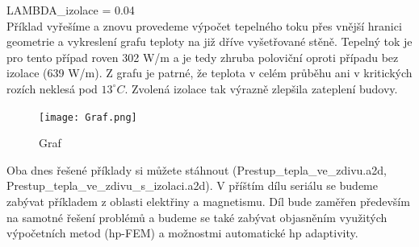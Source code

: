 \documentclass[a4paper, oneside]{article}
\begin{document}
LAMBDA\_izolace = 0.04\\
	
	Příklad vyřešíme a znovu provedeme výpočet tepelného toku přes vnější hranici geometrie a vykreslení grafu teploty na již dříve vyšetřované stěně. Tepelný tok je pro tento případ roven 302 W/m a je tedy zhruba poloviční oproti případu bez izolace (639 W/m). Z grafu je patrné, že teplota v celém průběhu ani v kritických rozích neklesá pod $13^\circ C$. Zvolená izolace tak výrazně zlepšila zateplení budovy.\\
	
\begin{figure}[htbp]
\centering
\texttt{[image: Graf.png]}\\
\caption{Graf}
\end{figure}

	Oba dnes řešené příklady si můžete stáhnout (Prestup\_tepla\_ve\_zdivu.a2d,\\ Prestup\_tepla\_ve\_zdivu\_s\_izolaci.a2d). V příštím dílu seriálu se budeme zabývat příkladem z oblasti elektřiny a magnetismu. Díl bude zaměřen především na samotné řešení problémů a budeme se také zabývat objasněním využitých výpočetních metod (hp-FEM) a možnostmi automatické hp adaptivity.
\end{document}
